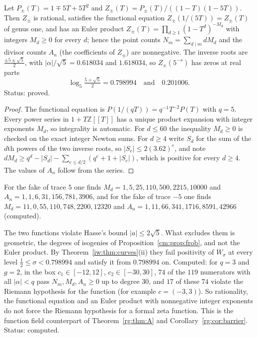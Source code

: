 \begin{proposition}\label{rg:prop:fakes}
Let $P_\pm(T)=1\mp5T+5T^2$ and $Z_\pm(T)=P_\pm(T)/((1-T)(1-5T))$. Then $Z_\pm$ is rational, satisfies the functional equation $Z_\pm(1/(5T))=Z_\pm(T)$ of genus one, and has an Euler product $Z_\pm(T)=\prod_{d\ge1}(1-T^d)^{-M_d}$ with integers $M_d\ge0$ for every $d$; hence the point counts $N_m=\sum_{d\mid m}dM_d$ and the divisor counts $A_n$ (the coefficients of $Z_\pm$) are nonnegative. The inverse roots are $\frac{\pm5\pm\sqrt5}2$, with $|\alpha|/\sqrt5=0.618034$ and $1.618034$, so $Z_\pm(5^{-s})$ has zeros at real parts
\[
\log_5\tfrac{5+\sqrt5}2=0.798994\quad\text{and}\quad0.201006.
\]
Status: proved.
\end{proposition}

\begin{proof}
The functional equation is $P(1/(qT))=q^{-1}T^{-2}P(T)$ with $q=5$. Every power series in $1+T\mathbb Z[[T]]$ has a unique product expansion with integer exponents $M_d$, so integrality is automatic. For $d\le60$ the inequality $M_d\ge0$ is checked on the exact integer Newton sums. For $d\ge4$ write $S_d$ for the sum of the $d$th powers of the two inverse roots, so $|S_e|\le2(3.62)^e$, and note $dM_d\ge q^d-|S_d|-\sum_{e\le d/2}(q^e+1+|S_e|)$, which is positive for every $d\ge4$. The values of $A_n$ follow from the series.
\end{proof}

For the fake of trace $5$ one finds $M_d=1,5,25,110,500,2215,10000$ and $A_n=1,1,6,31,156,781,3906$, and for the fake of trace $-5$ one finds $M_d=11,0,55,110,748,2200,12320$ and $A_n=1,11,66,341,1716,8591,42966$ (computed).

\begin{remark}
The two functions violate Hasse's bound $|a|\le2\sqrt5$. What excludes them is geometric, the degrees of isogenies of Proposition~\ref{cm:prop:frob}, and not the Euler product. By Theorem~\ref{iw:thm:curves}(ii) they fail positivity of $W_\sigma$ at every level $\frac12\le\sigma<0.798994$ and satisfy it from $0.798994$ on. Computed: for $q=3$ and $g=2$, in the box $c_1\in[-12,12]$, $c_2\in[-30,30]$, $74$ of the $119$ numerators with all $|\alpha|<q$ pass $N_m,M_d,A_n\ge0$ up to degree $30$, and $17$ of these $74$ violate the Riemann hypothesis for the function (for example $c=(-3,3)$). So rationality, the functional equation and an Euler product with nonnegative integer exponents do not force the Riemann hypothesis for a formal zeta function. This is the function field counterpart of Theorem~\ref{rg:thm:A} and Corollary~\ref{rg:cor:barrier}. Status: computed.
\end{remark}

